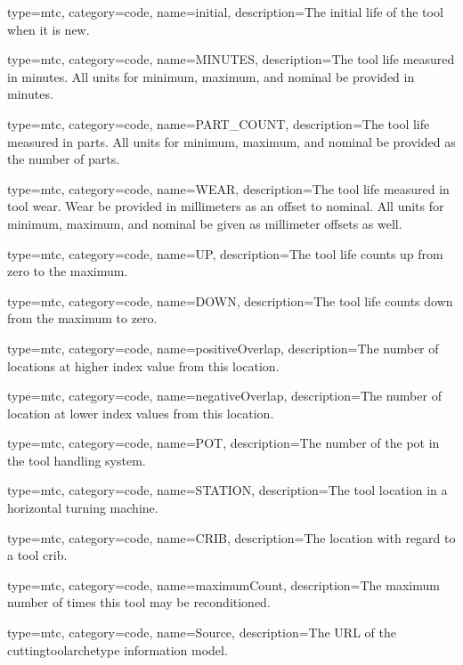 {
  type=mtc,
  category=code,
  name={initial},
  description={The initial life of the tool when it is new.}
}

{
  type=mtc,
  category=code,
  name={MINUTES},
  description={The tool life measured in minutes. All units for minimum, maximum, and nominal \MUST be provided in minutes.}
}

{
  type=mtc,
  category=code,
  name={PART\_COUNT},
  description={The tool life measured in parts. All units for minimum, maximum, and nominal \MUST be provided as the number of parts.}
}

{
  type=mtc,
  category=code,
  name={WEAR},
  description={The tool life measured in tool wear. Wear \MUST be provided in millimeters as an offset to nominal. All units for minimum, maximum, and nominal \MUST be given as millimeter offsets as well. }
}

{
  type=mtc,
  category=code,
  name={UP},
  description={The tool life counts up from zero to the maximum.}
}

{
  type=mtc,
  category=code,
  name={DOWN},
  description={The tool life counts down from the maximum to zero.}
}

{
  type=mtc,
  category=code,
  name={positiveOverlap},
  description={The number of locations at higher index value from this location.}
}

{
  type=mtc,
  category=code,
  name={negativeOverlap},
  description={The number of location at lower index values from this location.}
}

{
  type=mtc,
  category=code,
  name={POT},
  description={The number of the pot in the tool handling system.}
}

{
  type=mtc,
  category=code,
  name={STATION},
  description={The tool location in a horizontal turning machine.}
}

{
  type=mtc,
  category=code,
  name={CRIB},
  description={The location with regard to a tool crib.}
}

{
  type=mtc,
  category=code,
  name={maximumCount},
  description={The maximum number of times this tool may be reconditioned.}
}

{
  type=mtc,
  category=code,
  name={Source},
  description={The URL of the \gls{cuttingtoolarchetype} \gls{information model}.}
}


